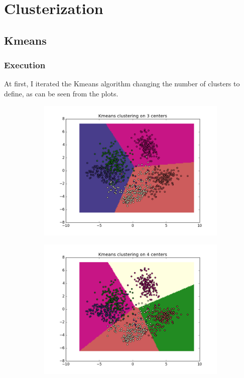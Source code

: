 \documentclass{article}
\begin{document}
				\section{Clusterization}
				\subsection{Kmeans}
				\subsubsection{Execution}
				At first, I iterated the Kmeans algorithm changing the number of clusters to define, as can be seen from the plots.
		
								\begin{center}
				\begin{figure}
\centering
        \begin{subfigure}[b]{0.48\textwidth}
                \centering
                \includegraphics[width=\linewidth]{figure_1}
        \end{subfigure}\hfill
        \begin{subfigure}[b]{0.48\textwidth}
                \centering
                \includegraphics[width=\linewidth]{figure_2}
        \end{subfigure}\hfill
 \label{fig:1}
 \end{figure}
       

\end{center}
\end{document}
